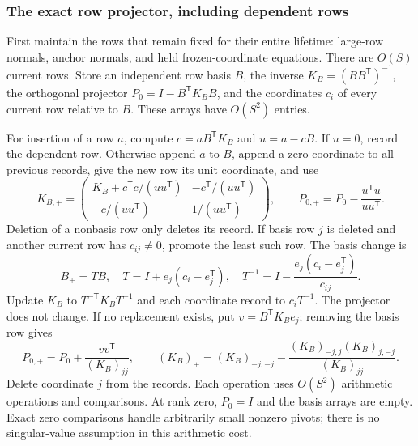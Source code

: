\documentclass[11pt]{amsart}
\theoremstyle{definition}\newtheorem{definition}[theorem]{Definition}
\theoremstyle{remark}\newtheorem{remark}[theorem]{Remark}
\numberwithin{equation}{section}
\begin{document}
\subsubsection{The exact row projector, including dependent rows}
\label{m:subsec:projector}
First maintain the rows that remain fixed for their entire lifetime:
large-row normals, anchor normals, and held frozen-coordinate equations. There are $O(S)$ current rows.
Store an independent row basis $B$, the inverse
$K_B=(BB^{\mathsf T})^{-1}$, the orthogonal projector
$P_0=I-B^{\mathsf T}K_BB$, and the coordinates $c_i$ of every current row
relative to $B$. These arrays have $O(S^2)$ entries.

For insertion of a row $a$, compute
$c=aB^{\mathsf T}K_B$ and $u=a-cB$. If $u=0$, record the dependent row.
Otherwise append $a$ to $B$, append a zero coordinate to all previous
records, give the new row its unit coordinate, and use
\begin{equation}
 K_{B,+}=\begin{pmatrix}
 K_B+c^{\mathsf T}c/(uu^{\mathsf T})&-c^{\mathsf T}/(uu^{\mathsf T})\\
 -c/(uu^{\mathsf T})&1/(uu^{\mathsf T})
 \end{pmatrix},\qquad
 P_{0,+}=P_0-\frac{u^{\mathsf T}u}{uu^{\mathsf T}}.           \label{m:eq:insert}
\end{equation}
Deletion of a nonbasis row only deletes its record. If basis row $j$ is
deleted and another current row has $c_{ij}\ne0$, promote the least such
row. The basis change is
\begin{equation}
 B_+=TB,\quad T=I+e_j(c_i-e_j^{\mathsf T}),\quad
 T^{-1}=I-\frac{e_j(c_i-e_j^{\mathsf T})}{c_{ij}}.
                                                               \label{m:eq:exchange}
\end{equation}
Update $K_B$ to $T^{-\mathsf T}K_BT^{-1}$ and each coordinate record to
$c_iT^{-1}$. The projector does not change. If no replacement exists, put
$v=B^{\mathsf T}K_Be_j$; removing the basis row gives
\begin{equation}
 P_{0,+}=P_0+\frac{vv^{\mathsf T}}{(K_B)_{jj}},\qquad
 (K_B)_+=(K_B)_{-j,-j}
  -\frac{(K_B)_{-j,j}(K_B)_{j,-j}}{(K_B)_{jj}}.             \label{m:eq:delete}
\end{equation}
Delete coordinate $j$ from the records. Each operation uses $O(S^2)$
arithmetic operations and comparisons. At rank zero, $P_0=I$ and the
basis arrays are empty. Exact zero comparisons handle arbitrarily small
nonzero pivots; there is no singular-value assumption in this arithmetic
cost.
\end{document}
